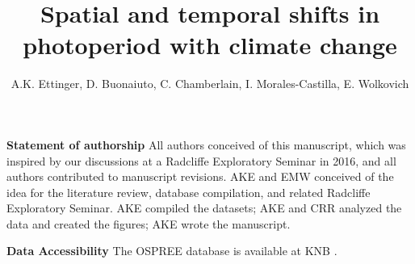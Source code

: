 \documentclass{article}
\begin{document}


\title{Spatial and temporal shifts in photoperiod with climate change} %

\author{A.K. Ettinger, D. Buonaiuto, C. Chamberlain, I. Morales-Castilla, E. Wolkovich}










 



\date{} 

\maketitle %
\textbf{Statement of authorship} 
All authors conceived of this manuscript, which was inspired by our discussions at a Radcliffe Exploratory Seminar in 2016, and all authors contributed to manuscript revisions. AKE and EMW conceived of the idea for the literature review, database compilation, and related Radcliffe Exploratory Seminar. AKE compiled the datasets; AKE and CRR analyzed the data and created the figures; AKE wrote the manuscript.

\textbf{Data Accessibility} The OSPREE database is available at KNB \citep[doi:10.5063/F1QV3JQR][]{wolkovich2019}.
\end{document}
